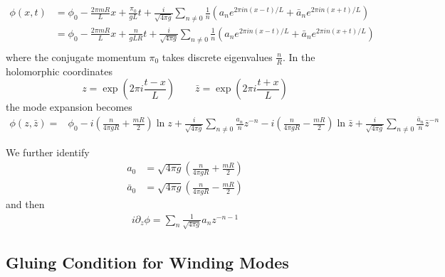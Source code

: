 \begin{widetext}
\begin{equation}
\begin{aligned}
\phi( x, t ) &= \phi_0 - \frac{2\pi m R}{L}x + \frac{\pi_0}{gL} t  + \frac{i}{\sqrt{4 \pi g}}\sum_{n\neq0}\frac{1}{n}(a_ne^{2\pi i n(x-t)/L}+ \bar{a}_{n} e^{2\pi i n(x+t)/L})\\  
&= \phi_0 - \frac{2\pi m R}{L}x + \frac{n}{gLR} t  +  \frac{i}{\sqrt{4 \pi g}}\sum_{n\neq0}\frac{1}{n}(a_ne^{2\pi i n(x-t)/L}+ \bar{a}_{n} e^{2\pi i n(x+t)/L})\\ 
\end{aligned}
\end{equation}
where the conjugate momentum $\pi_0$ takes discrete eigenvalues $\frac{n}{R}$. In the holomorphic coordinates
\begin{equation}
\label{eq:zzbar}
z = \exp( 2 \pi i \frac{t - x}{L}) \qquad \bar{z} = \exp( 2 \pi i \frac{t + x}{L})
\end{equation}
the mode expansion becomes
\begin{equation}
\label{eq:boson-mode-exp}
\begin{aligned}
\phi( z, \bar{z}) = &\phi_0 -i \left( \frac{n}{4\pi g  R} + \frac{m R }{2} \right)  \ln z + \frac{i}{\sqrt{4\pi g}} \sum_{n\ne 0 } \frac{a_n}{n} z^{-n } -i \left( \frac{n}{4\pi g R} - \frac{m R }{2} \right)  \ln \bar{z} + \frac{i}{\sqrt{4\pi g}} \sum_{n\ne 0 } \frac{\bar{a}_n}{n} \bar{z}^{-n } 
\end{aligned}
\end{equation}
\end{widetext}
We further identify 
\begin{equation}
\begin{aligned}
  a_0 &= \sqrt{ 4 \pi g } \left( \frac{n}{4\pi g R} + \frac{m R }{2} \right) \\
   \bar{a}_0 &= \sqrt{ 4 \pi g } \left( \frac{n}{4\pi g R} - \frac{m R }{2} \right)
  \end{aligned}
\end{equation}
and then 
\begin{equation}
\begin{aligned}
i \partial_z \phi =  \sum_n \frac{1}{\sqrt{4\pi g}} a_n z^{-n-1} 
\end{aligned}
\end{equation}

\subsection{Gluing Condition for Winding Modes}
\label{app_sub:compact_gluing_boundary}

